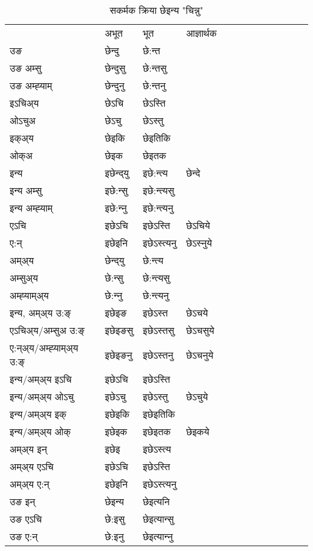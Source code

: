 \begin{table}[H]
\label{ent.vt} \centering
\caption{सकर्मक क्रिया  छेइन्य  "चिन्नु"  }
\begin{tabular}{l|l|l|l|l|l|l|l|l|l|l|l|l}  \toprule
&अभूत & भूत & आज्ञार्थक \\ 
उङ &छेन्दु &छे:न्त \\ 
उङ अम्सु&छेन्दुसु &छे:न्तसु \\ 
उङ अम्ह्‍याम्&छेन्दुनु &छे:न्तनु \\ 
इऽचिअ्य &छेऽचि &छेऽस्ति   \\ 
ओऽचुअ        &छेऽचु &छेऽस्तु   \\ 
इक्अ्य&छेइकि &छेइतिकि   \\ 
ओक्अ &छेइक &छेइतक   \\ 
इन्य & इछेन्द्‌यु  & इछे:न्त्य &छेन्दे  \\ 
इन्य अम्सु& इछे:न्सु  & इछे:न्त्यसु   \\ 
इन्य अम्ह्‍याम्& इछे:न्‍नु  & इछे:न्त्यनु   \\ 
एऽचि & इछेऽचि & इछेऽस्ति &छेऽचिये    \\ 
ए:न् & इछेइनि  & इछेऽस्त्यनु &छेऽस्‍नुये  \\ 
अम्अ्य & छेन्द्‌यु  & छे:न्त्य  \\ 
अम्सुअ्य & छे:न्सु & छे:न्त्यसु  \\ 
अम्ह्‍याम्अ्य & छे:न्‍नु  & छे:न्त्यनु \\ 
\midrule
इन्य, अम्अ्य उ:ङ्‌ &इछेइङ &इछेऽस्त &छेऽचये \\ 
एऽचिअ्य/अम्सुअ उ:ङ्‌ &इछेइङसु &इछेऽस्तसु &छेऽचसुये \\ 
ए:न्अ्य/अम्ह्‍याम्अ्य उ:ङ्‌ &इछेइङनु &इछेऽस्तनु &छेऽचनुये \\ 
इन्य/अम्अ्य इऽचि &इछेऽचि &इछेऽस्ति    \\ 
इन्य/अम्अ्य ओऽचु &इछेऽचु &इछेऽस्तु  &छेऽचुये  \\ 
इन्य/अम्अ्य इक् &इछेइकि &इछेइतिकि   \\ 
इन्य/अम्अ्य ओक् &इछेइक &इछेइतक  &छेइकये  \\ 
अम्अ्य इन् & इछेइ & इछेऽस्त्य   \\ 
अम्अ्य एऽचि & इछेऽचि & इछेऽस्ति    \\ 
अम्अ्य ए:न् & इछेइनि  & इछेऽस्त्यनु  \\ 
\midrule
उङ इन् & छेइन्य  & छेइत्यनि  \\ 
उङ एऽचि & छे:इसु  & छेइत्यान्सु   \\ 
उङ ए:न्& छे:इनु  & छेइत्यान्‍नु   \\ 
\bottomrule
\end{tabular}
\end{table}



